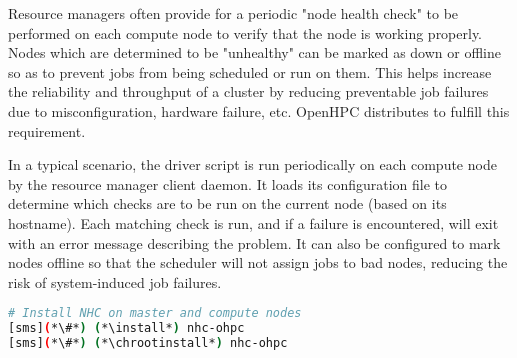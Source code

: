 Resource managers often provide for a periodic "node health check" to be
performed on each compute node to verify that the node is working
properly. Nodes which are determined to be "unhealthy" can be marked as down or
offline so as to prevent jobs from being scheduled or run on them. This helps
increase the reliability and throughput of a cluster by reducing preventable
job failures due to misconfiguration, hardware failure, etc. OpenHPC
distributes \nhc{} to fulfill this requirement.

In a typical scenario, the \nhc{} driver script is run periodically on each compute
node by the resource manager client daemon. It loads its
configuration file to determine which checks are to be run on the current node
(based on its hostname). Each matching check is run, and if a failure is
encountered, \nhc{} will exit with an error message describing the problem. It can
also be configured to mark nodes offline so that the scheduler will not assign
jobs to bad nodes, reducing the risk of system-induced job failures.

\begin{lstlisting}[language=bash,keywords={},upquote=true]
# Install NHC on master and compute nodes
[sms](*\#*) (*\install*) nhc-ohpc
[sms](*\#*) (*\chrootinstall*) nhc-ohpc
\end{lstlisting}

